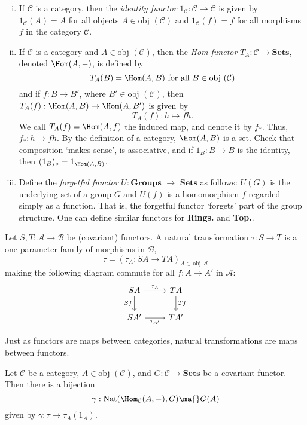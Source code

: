 \begin{ex} \hfill
	\begin{enumerate}[(i)]
	\item If $\mathcal{C}$ is a category, then the \emph{identity functor} $1_\mathcal{C}: \mathcal{C} \to \mathcal{C}$ is given by $1_\mathcal{C}(A)=A$ for all objects $A \in \text{obj }(\mathcal{C})$ and $1_\mathcal{C}(f)=f$ for all morphisms $f$ in the category $\mathcal{C}$.
	\item If $\mathcal{C}$ is a category and $A \in \text{obj }(\mathcal{C})$, then the \emph{Hom functor} $T_A: \mathcal{C} \to \textbf{Sets}$, denoted $\Hom(A, -)$, is defined by
		\[
		T_A(B)= \Hom(A,B) \text{ for all } B \in \text{obj }(\mathcal{C})
		\]
	and if $f: B \to B'$, where $B' \in \text{obj }(\mathcal{C})$, then $T_A(f): \Hom(A,B) \to \Hom(A,B')$ is given by
		\[
		T_A(f): h \mapsto fh.
		\]
	We call $T_A(f)=\Hom(A,f)$ the induced map, and denote it by $f_*$. Thus, $f_*: h \mapsto fh$. By the definition of a category, $\Hom(A,B)$ is a set. Check that composition `makes sense', is associative, and if $1_B: B \to B$ is the identity, then $(1_B)_*=1_{\Hom(A,B)}$. 
	\item Define the \emph{forgetful functor} $U: \textbf{Groups } \to \textbf{ Sets}$ as follows: $U(G)$ is the underlying set of a group $G$ and $U(f)$ is a homomorphism $f$ regarded simply as a function. That is, the forgetful functor `forgets' part of the group structure. One can define similar functors for \textbf{Rings.} and \textbf{Top.}. 
	\end{enumerate} \xqed
\end{ex}


\begin{dfn}
Let $S,T: \mathcal{A} \to \mathcal{B}$ be (covariant) functors. A natural transformation $\tau: S \to T$ is a one-parameter family of morphisms in $\mathcal{B}$,
	\[
	\tau= (\tau_A: SA \to TA)_{A \in \,\text{obj }\mathcal{A}}
	\]
making the following diagram commute for all $f: A \to A'$ in $\mathcal{A}$:
	\[
	\begin{tikzcd}
	SA \arrow{r}{\tau_A} \arrow[swap]{d}{Sf} & TA \arrow{d}{Tf} \\
	SA' \arrow[swap]{r}{\tau_{A'}} & TA'
	\end{tikzcd}
	\]
\end{dfn}

\noindent Just as functors are maps between categories, natural transformations are maps between functors. 


\begin{thm}
Let $\mathcal{C}$ be a category, $A \in \text{obj }(\mathcal{C})$, and $G: \mathcal{C} \to \textbf{Sets}$ be a covariant functor. Then there is a bijection
	\[
	\gamma: \text{Nat}(\Hom_\mathcal{C}(A,-),G) \ma{} G(A)
	\]
given by $\gamma: \tau \mapsto \tau_A(1_A)$. 
\end{thm}



